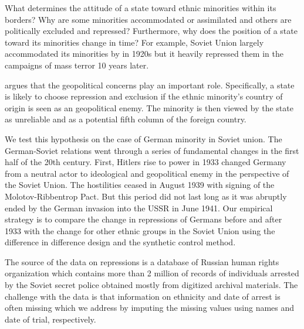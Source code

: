 What determines the attitude of a state toward ethnic minorities within
its borders? Why are some minorities accommodated or assimilated and
others are politically excluded and repressed? Furthermore,  why does the
position of a state toward its minorities change in time? For example,
Soviet Union largely accommodated its minorities by in 1920s but it
heavily repressed them in the campaigns of  mass terror 10 years later. 

\citet{mylonas_politics_2013} argues that the geopolitical concerns play an important role. Specifically, a state is likely to choose repression and
exclusion if the ethnic minority's country of origin is seen as an
geopolitical enemy. The minority is then viewed by the state as
unreliable and as a potential fifth column of the foreign country.   

We test this hypothesis on the case of German minority in Soviet union.
The German-Soviet relations went through a series of fundamental changes in  the first half of the 20th century. 
First, Hitlers rise to power in 1933 changed Germany from a neutral actor to ideological and geopolitical enemy in the perspective of the Soviet Union. The hostilities ceased in August 1939 with signing of the Molotov-Ribbentrop Pact. But this period did not last long as it was abruptly ended by the German invasion into the USSR in June 1941. 
Our empirical strategy is to compare the change in repressions of Germans before and after 1933  with the change for other ethnic groups in the Soviet Union using the difference in difference design and the synthetic control method. 

The source of the data on repressions is a database of  Russian human rights organization \citet{memorial_zhertvy_2017} which contains more than 2 million of records of individuals arrested by the Soviet secret police obtained mostly from digitized archival materials. 
The challenge with the data is that information on ethnicity and date of arrest is often missing which we address by imputing the missing values using names and date of trial, respectively. 


